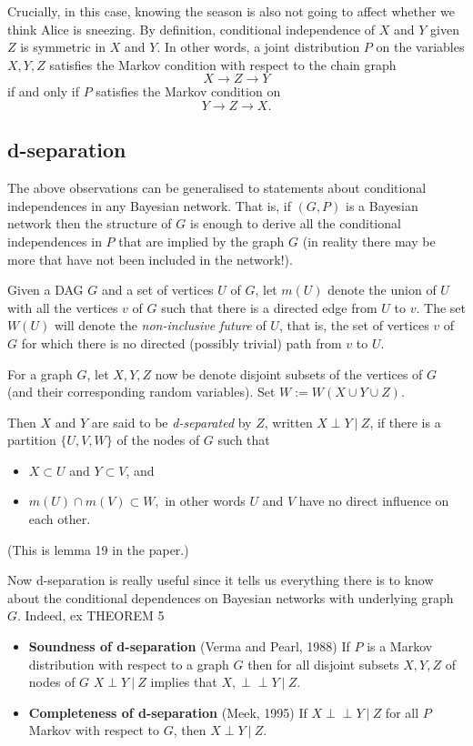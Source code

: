 \documentclass[11pt, oneside]{article}   	%
\def\ci{\perp\!\!\!\perp}
\begin{document}
Crucially, in this case, knowing the season is also not going to affect whether we think Alice is sneezing. By definition, conditional independence of $X$ and $Y$ given $Z$ is symmetric in $X$ and $Y$. In other words, a joint distribution $P$ on the variables $X,Y,Z$ satisfies the Markov condition with respect to the chain graph 
\[ X \longrightarrow Z \longrightarrow Y \]  if and only if $P$ satisfies the Markov condition on 
\[ Y \longrightarrow  Z \longrightarrow X .\]


\subsection{d-separation}

The above observations can be generalised to statements about conditional independences in any Bayesian network. That is, if $(G,P)$ is a Bayesian network then the structure of $G$ is enough to derive all the conditional independences in $P$ that are implied by the graph $G$ (in reality there may be more that have not been included in the network!).

Given a DAG $G$ and a set of vertices $U$ of $G$, let $m(U)$ denote the union of $U$ with all the vertices $v$ of $G$ such that there is a directed edge from $U$ to $v$. The set $W(U)$ will denote the \emph{non-inclusive future} of $U$, that is, the set of vertices $v$ of $G$ for which there is no directed (possibly trivial) path from $v$ to $U$. 

For a graph $G$,  let $X, Y, Z$ now be denote disjoint subsets of the vertices of $G$ (and their corresponding random variables). Set $W := W(X \cup Y \cup Z)$.%

Then $X$ and $Y$ are said to be \emph{d-separated} by $Z$, written $X \perp Y   \ | \ Z$, if there is a partition $\{U,V,W\}$ of the nodes of $ G$ such that 
\begin{itemize}
\item $X \subset U$ and $Y \subset V$, and \item $m(U) \cap m(V) \subset W,$ in other words $U$ and $V$ have no direct influence on each other. \end{itemize} (This is lemma 19 in the paper.)

Now d-separation is really useful since it tells us everything there is to know about the conditional dependences on Bayesian networks with underlying graph $G$. Indeed, 
 ex
THEOREM 5

\begin{itemize} \item \textbf{Soundness of d-separation} (Verma and Pearl, 1988)
If $P$ is a Markov distribution with respect to a graph $G$ then for all disjoint subsets $X,Y,Z$ of nodes of $G$  $X \perp Y   \ | \ Z$ implies that $X,\ci Y   \ | \ Z$.
\item \textbf{Completeness of d-separation} (Meek, 1995)
If $X \ci Y   \ | \ Z$ for all $P$ Markov with respect to $G$, then $ X \perp Y   \ | \ Z$.
\end{itemize}
\end{document}
